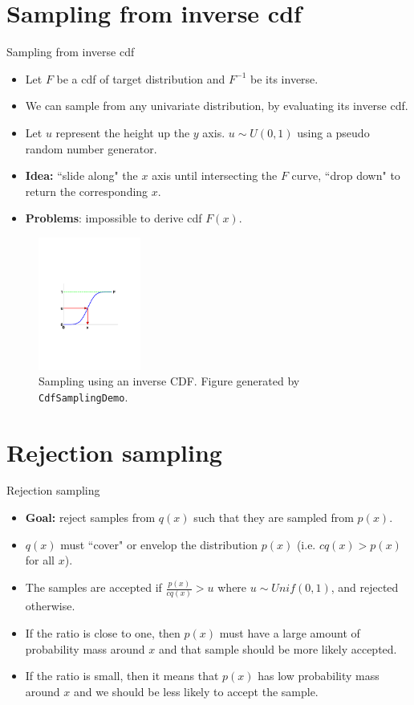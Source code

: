 \documentclass[10pt,mathserif]{beamer}
\begin{document}
\section{Sampling from inverse cdf}
\begin{frame}{Sampling from inverse cdf} 
\begin{itemize}
    \item Let $F$ be a cdf of target distribution and $F^{-1}$ be its inverse.
    \item We can sample from any univariate distribution, by evaluating its inverse cdf.
    \item Let $u$ represent the height up the $y$ axis. $u \sim U(0,1)$ using a pseudo random number generator.
    \item  \textbf{Idea:} ``slide along" the $x$ axis until intersecting the $F$ curve, ``drop down" to  return the corresponding $x$.
    \item  \textbf{Problems}: impossible to derive cdf $F(x)$.
\end{itemize}

\begin{figure}[h]
\centering
\includegraphics[width=0.3\textwidth]{sampleCdf}
\caption{Sampling using an inverse CDF. Figure generated by \texttt{CdfSamplingDemo}.}
\end{figure}    
\end{frame}

\section{Rejection sampling}
\begin{frame}{Rejection sampling}
\begin{itemize}
    \item \textbf{Goal:} reject samples from $q(x)$ such that they are sampled from $p(x)$.
    \item $q(x)$ must ``cover" or envelop the distribution $p(x)$ (i.e. $cq(x) > p(x)$ for all $x$).
    \item The samples are accepted if $\frac{p(x)}{cq(x)} > u $ where $u \sim Unif(0,1)$, and rejected otherwise.
    \item If the ratio is close to one, then $p(x)$ must have a large amount of probability mass around $x$ and that sample should be more likely accepted.
    \item If the ratio is small, then it means that $p(x)$ has low probability mass around $x$ and we should be less likely to accept the sample.
\end{itemize}    
\end{frame}
\end{document}
